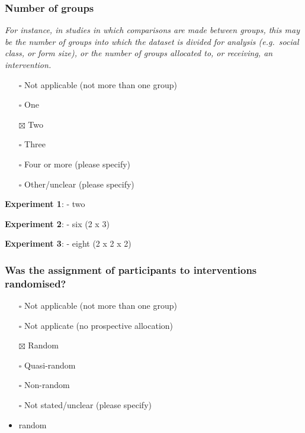 \documentclass[
  doc, a4paper]{apa7}
\providecommand{\tightlist}{%
  \setlength{\itemsep}{0pt}\setlength{\parskip}{0pt}}
\begin{document}
\subsubsection{Number of groups}\label{number-of-groups}

\emph{For instance, in studies in which comparisons are made between groups, this may be the number of groups into which the dataset is divided for analysis (e.g.~social class, or form size), or the number of groups allocated to, or receiving, an intervention.}

\begin{itemize}
\tightlist
\item[$\square$]
  Not applicable (not more than one group)\\
\item[$\square$]
  One\\
\item[$\boxtimes$]
  Two\\
\item[$\square$]
  Three\\
\item[$\square$]
  Four or more (please specify)\\
\item[$\square$]
  Other/unclear (please specify)
\end{itemize}

\textbf{Experiment 1}:
- two

\textbf{Experiment 2}:
- six (2 x 3)

\textbf{Experiment 3}:
- eight (2 x 2 x 2)

\subsubsection{Was the assignment of participants to interventions randomised?}\label{was-the-assignment-of-participants-to-interventions-randomised}

\begin{itemize}
\item[$\square$]
  Not applicable (not more than one group)\\
\item[$\square$]
  Not applicate (no prospective allocation)\\
\item[$\boxtimes$]
  Random\\
\item[$\square$]
  Quasi-random\\
\item[$\square$]
  Non-random\\
\item[$\square$]
  Not stated/unclear (please specify)
\item
  random
\end{itemize}
\end{document}

